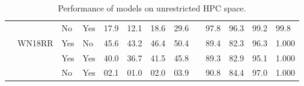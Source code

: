 \begin{table}[!h]
{\begin{tabular}{@{}lllllllllllll@{}}
     &  & No & Yes & 17.9 & 12.1 & 18.6 & 29.6 &  & 97.8 & 96.3 & 99.2 & 99.8 \\ \cmidrule(l){2-13} 
     & WN18RR & Yes & No & 45.6 & 43.2 & 46.4 & 50.4 &  & 89.4 & 82.3 & 96.3 & 1.000 \\
     &  & Yes & Yes & 40.0 & 36.7 & 41.5 & 45.8 &  & 89.3 & 82.9 & 95.1 & 1.000 \\
     &  & No & Yes & 02.1 & 01.0 & 02.0 & 03.9 &  & 90.8 & 84.4 & 97.0 & 1.000 \\ \bottomrule
    \end{tabular}%
    }
    \caption{Performance of models on unrestricted HPC space.}
    \label{tab:Full ICLR results}
    \end{table}


